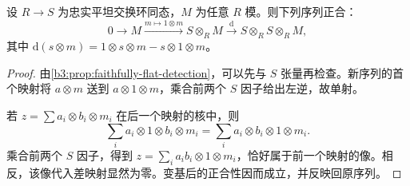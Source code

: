 \begin{lemma}\label{b3:lem:faithful-flat-equalizer}
	设 \(R\to S\) 为忠实平坦交换环同态，\(M\) 为任意 \(R\) 模。则下列序列正合：
	\[
		0\longrightarrow M\xrightarrow{m\mapsto1\otimes m}S\otimes_RM \xrightarrow{\mathrm{d}}S\otimes_RS\otimes_RM,
	\]
	其中 \(\mathrm{d}(s\otimes m)=1\otimes s\otimes m-s\otimes1\otimes m\)。
\end{lemma}
\begin{proof}
	由\cref{b3:prop:faithfully-flat-detection}，可以先与 \(S\) 张量再检查。新序列的首个映射将 \(a\otimes m\) 送到 \(a\otimes1\otimes m\)，乘合前两个 \(S\) 因子给出左逆，故单射。

	若 \(z=\sum a_i\otimes b_i\otimes m_i\) 在后一个映射的核中，则
	\[
		\sum_i a_i\otimes1\otimes b_i\otimes m_i =\sum_i a_i\otimes b_i\otimes1\otimes m_i.
	\]
	乘合前两个 \(S\) 因子，得到 \(z=\sum_i a_ib_i\otimes1\otimes m_i\)，恰好属于前一个映射的像。相反，该像代入差映射显然为零。变基后的正合性因而成立，并反映回原序列。
\end{proof}

